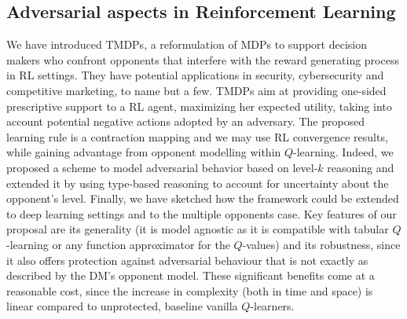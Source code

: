 \subsection{Adversarial aspects in Reinforcement Learning}\label{sec:final}
We have introduced TMDPs, a reformulation of MDPs to 
 support decision makers who confront opponents that interfere 
with the reward generating process in RL settings.
They have potential applications in security, cybersecurity and 
competitive marketing, to name but a few.
TMDPs aim at providing one-sided prescriptive support to a RL agent, maximizing her expected utility, taking into account potential negative actions adopted by an adversary. %
  The proposed learning rule is a contraction mapping and we may use RL convergence results, while gaining advantage from 
  opponent modelling within $Q$-learning. Indeed, we proposed a scheme to model adversarial behavior based on level-$k$ reasoning
and extended it by using type-based reasoning to account for uncertainty about the opponent's level. Finally, we have sketched how the framework could be extended to deep learning settings and to the multiple opponents case. Key features of our proposal are its generality
(it is model agnostic as it is compatible with tabular $Q$-learning or any function approximator for the $Q$-values) and its robustness, since it also offers 
protection against adversarial behaviour that is not exactly as described by the DM's opponent model. These significant benefits come at a reasonable cost, since the increase in complexity (both in time and space) is linear compared to unprotected, baseline vanilla $Q$-learners.

